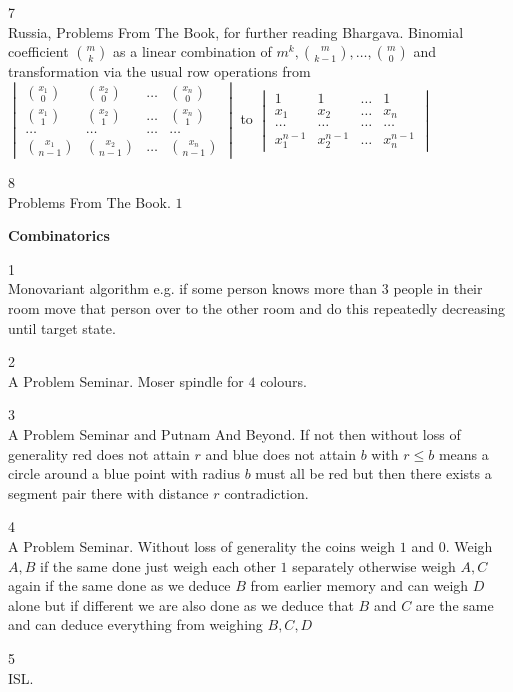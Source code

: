 7 \\
Russia, Problems From The Book, for further reading Bhargava. Binomial coefficient $\binom{m}{k}$ as a linear combination of $m^k,\binom{m}{k-1},\dots,\binom{m}{0}$ and transformation via the usual row operations from
$
\begin{vmatrix}
\binom{x_1}{0} & \binom{x_2}{0} & \dots & \binom{x_n}{0} \\
\binom{x_1}{1} & \binom{x_2}{1} & \dots & \binom{x_n}{1} \\
\dots & \dots & \dots & \dots \\
\binom{x_1}{n-1} & \binom{x_2}{n-1} & \dots & \binom{x_n}{n-1}
\end{vmatrix}
$
to
$
\begin{vmatrix}
1 & 1 & \dots & 1 \\
x_1 & x_2 & \dots & x_n \\
\dots & \dots & \dots & \dots \\
x_1^{n-1} & x_2^{n-1} & \dots & x_n^{n-1}
\end{vmatrix}
$

8 \\
Problems From The Book. $\boxed{1}$

\newpage

\textbf{Combinatorics}

1 \\
Monovariant algorithm e.g. if some person knows more than $3$ people in their room move that person over to the other room and do this repeatedly decreasing until target state.

2 \\
A Problem Seminar. Moser spindle for $4$ colours.

3 \\
A Problem Seminar and Putnam And Beyond. If not then without loss of generality red does not attain $r$ and blue does not attain $b$ with $r \le b$ means a circle around a blue point with radius $b$ must all be red but then there exists a segment pair there with distance $r$ contradiction.

4 \\
A Problem Seminar. Without loss of generality the coins weigh $1$ and $0$. Weigh $A,B$ if the same done just weigh each other $1$ separately otherwise weigh $A,C$ again if the same done as we deduce $B$ from earlier memory and can weigh $D$ alone but if different we are also done as we deduce that $B$ and $C$ are the same and can deduce everything from weighing $B,C,D$

5 \\
ISL.

